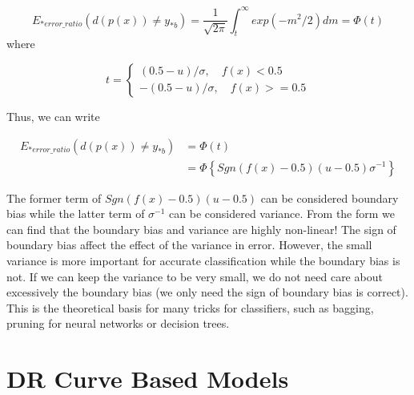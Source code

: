 \documentclass[runningheads,openany]{xhlPaper}
\begin{document}
\begin{displaymath}
E_{*error\_ratio}\left ( d\left ( p\left ( x \right ) \right ) \neq y_{*b}\right ) 
=\frac{1}{\sqrt{2 \pi} }\int_{t}^{\infty}exp\left ( -m^2 / {2} \right )dm = \Phi \left ( t \right )
\end{displaymath}
where 

\begin{displaymath}
t = \left\{\begin{array}{*{20}{l}}
\left ( 0.5 - u\right ) / \sigma, \quad f\left ( x \right ) < 0.5\\ 
-\left ( 0.5 - u\right ) / \sigma, \quad f\left ( x \right ) >= 0.5
\end{array}\right.
\end{displaymath}

Thus, we can write

\begin{displaymath}
\begin{aligned}
E_{*error\_ratio}\left ( d\left ( p\left ( x \right ) \right ) \neq y_{*b}\right ) &= \Phi \left ( t \right )\\
&=\Phi \left\{Sgn\left ( f\left ( x \right ) - 0.5 \right )\left ( u - 0.5 \right )\sigma^{-1} \right\}
\end{aligned}
\end{displaymath}

The former term of $Sgn\left ( f\left ( x \right ) - 0.5 \right )\left ( u - 0.5 \right )$ can be considered boundary bias while the latter term of $\sigma^{-1}$ can be considered variance.
From the form we can find that the boundary bias and variance are highly non-linear!
The sign of boundary bias affect the effect of the variance in error.
However, the small variance is more important for accurate classification while the boundary bias is not.
If we can keep the variance to be very small, we do not need care about excessively the boundary bias (we only need the sign of boundary bias is correct).
This is the theoretical basis for many tricks for classifiers, such as bagging, pruning for neural networks or decision trees.

\chapter{DR Curve Based Models}
\end{document}

